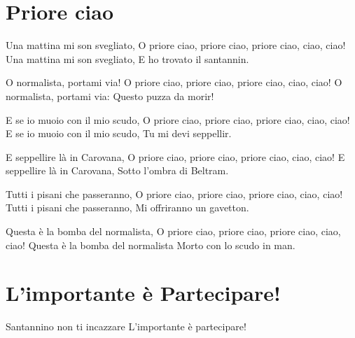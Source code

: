 \section{Priore ciao}
\subtitle{Sulla melodia di “Bella ciao“}
\begin{canzone}
Una mattina mi son svegliato,
O priore ciao, priore ciao, priore ciao, ciao, ciao!
Una mattina mi son svegliato,
E ho trovato il santannin.

O normalista, portami via!
O priore ciao, priore ciao, priore ciao, ciao, ciao!
O normalista, portami via:
Questo puzza da morir!

E se io muoio con il mio scudo,
O priore ciao, priore ciao, priore ciao, ciao, ciao!
E se io muoio con il mio scudo,
Tu mi devi seppellir.

E seppellire là in Carovana,
O priore ciao, priore ciao, priore ciao, ciao, ciao!
E seppellire là in Carovana,
Sotto l’ombra di Beltram.

Tutti i pisani che passeranno,
O priore ciao, priore ciao, priore ciao, ciao, ciao!
Tutti i pisani che passeranno,
Mi offriranno un gavetton.

Questa è la bomba del normalista,
O priore ciao, priore ciao, priore ciao, ciao, ciao!
Questa è la bomba del normalista
Morto con lo scudo in man.
\end{canzone}

\section{L'importante è Partecipare!}
\begin{canzone}
  Santannino non ti incazzare
  L'importante è partecipare!
\end{canzone}

